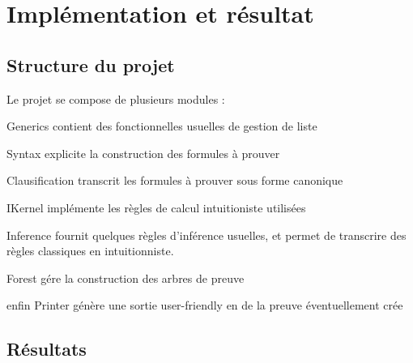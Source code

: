 
\section{Impl\'ementation et r\'esultat}

\subsection{Structure du projet}

Le projet se compose de plusieurs modules :

Generics contient des fonctionnelles usuelles de gestion de liste

Syntax explicite la construction des formules \`a prouver

Clausification transcrit les formules \`a prouver sous forme canonique

IKernel impl\'emente les r\`egles de calcul intuitioniste utilis\'ees

Inference fournit quelques r\`egles d'inf\'erence usuelles, et permet de transcrire des r\`egles classiques en intuitionniste.

Forest g\'ere la construction des arbres de preuve

enfin Printer g\'en\`ere une sortie user-friendly en \Latex de la preuve \'eventuellement cr\'ee



\subsection{R\'esultats}

